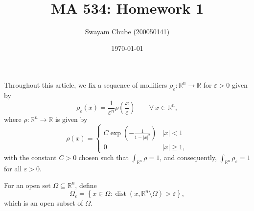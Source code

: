 \documentclass[10pt]{amsart}
\title{MA 534: Homework 1}
\author{Swayam Chube (200050141)}
\date{\today}
\theoremstyle{thmstyle}
\theoremstyle{defstyle}
\newcommand{\R}{\mathbb{R}}
\renewcommand{\ge}{\geqslant}
\newcommand{\dist}{\operatorname{dist}}
\begin{document}
\maketitle 

Throughout this article, we fix a sequence of mollifiers $\rho_\varepsilon:\R^n\to\R$ for $\varepsilon > 0$ given by 
\begin{equation*}
	\rho_\varepsilon(x) = \frac{1}{\varepsilon^n}\rho\left(\frac{x}{\varepsilon}\right)\qquad\forall~x\in\R^n,
\end{equation*}
where $\rho: \R^n\to\R$ is given by 
\begin{equation*}
	\rho(x) = 
	\begin{cases}
		C\exp\left(-\frac{1}{1 - |x|^2}\right) & |x| < 1\\
		0 & |x|\ge 1,
	\end{cases}
\end{equation*}
with the constant $C > 0$ chosen such that $\int_{\R^n}\rho = 1$, and consequently, $\int_{\R^n}\rho_\varepsilon = 1$ for all $\varepsilon > 0$.

For an open set $\Omega\subseteq\R^n$, define 
\begin{equation*}
	\Omega_\varepsilon = \left\{x\in\Omega\colon\dist(x,\R^n\setminus\Omega) > \varepsilon\right\},
\end{equation*}
which is an open subset of $\Omega$.
\end{document}
